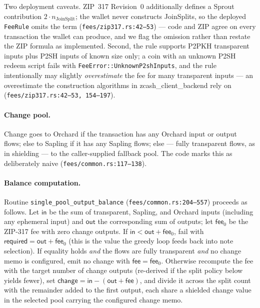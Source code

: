 \documentclass[11pt,a4paper]{article}
\theoremstyle{definition}
\begin{document}
Two deployment caveats. ZIP~317 Revision~0 additionally defines a Sprout
contribution $2 \cdot n_{\mathrm{JoinSplit}}$; the wallet never constructs
JoinSplits, so the deployed \texttt{FeeRule} omits the term
(\texttt{fees/zip317.rs:42--53}) --- code and ZIP agree on every transaction
the wallet can produce, and we flag the omission rather than restate the ZIP
formula as implemented. Second, the rule supports P2PKH transparent inputs
plus P2SH inputs of known size only; a coin with an unknown P2SH redeem
script fails with \texttt{FeeError::UnknownP2shInputs}, and the rule
intentionally may slightly \emph{overestimate} the fee for many transparent
inputs --- an overestimate the construction algorithms in
\textsf{zcash\_client\_backend} rely on (\texttt{fees/zip317.rs:42--53,
154--197}).

\paragraph{Change pool.} Change goes to Orchard if the transaction has any
Orchard input or output flows; else to Sapling if it has any Sapling flows;
else --- fully transparent flows, as in shielding --- to the caller-supplied
fallback pool. The code marks this as deliberately naive
(\texttt{fees/common.rs:117--138}).

\paragraph{Balance computation.} Routine
\texttt{single\_pool\_output\_balance} (\texttt{fees/common.rs:204--557})
proceeds as follows. Let $\mathsf{in}$ be the sum of transparent, Sapling,
and Orchard inputs (including any ephemeral input) and $\mathsf{out}$ the
corresponding sum of outputs; let $\mathsf{fee}_0$ be the ZIP-317 fee with
zero change outputs. If $\mathsf{in} < \mathsf{out} + \mathsf{fee}_0$, fail
with $\mathsf{required} = \mathsf{out} + \mathsf{fee}_0$ (this is the value
the greedy loop feeds back into note selection). If equality holds
\emph{and} the flows are fully transparent \emph{and} no change memo is
configured, emit no change with $\mathsf{fee} = \mathsf{fee}_0$. Otherwise
recompute the fee with the target number of change outputs (re-derived if
the split policy below yields fewer), set
$\mathsf{change} = \mathsf{in} - (\mathsf{out} + \mathsf{fee})$, and divide
it across the split count with the remainder added to the first output, each
share a shielded change value in the selected pool carrying the configured
change memo.
\end{document}
